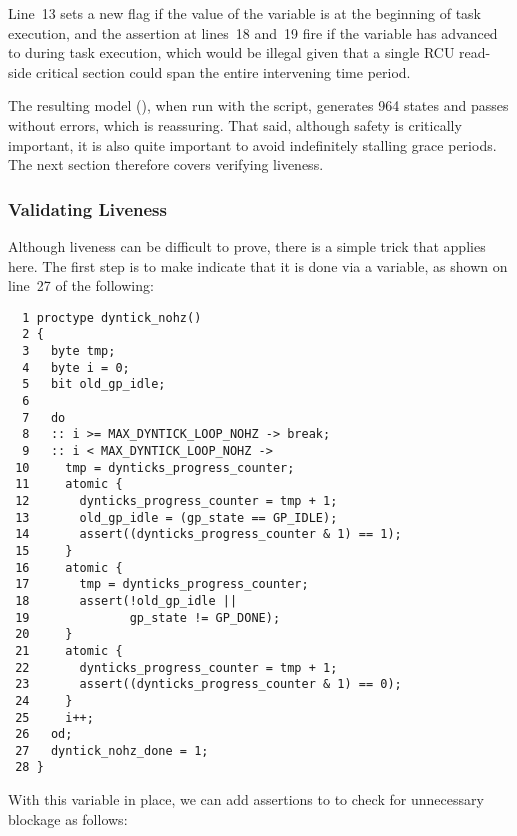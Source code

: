 Line~13 sets a new  flag if the
value of the  variable is
 at the beginning of task execution,
and the assertion at lines~18 and~19 fire if the 
variable has advanced to  during task execution,
which would be illegal given that a single RCU read-side critical
section could span the entire intervening time period.

The resulting
model (),
when run with the  script,
generates 964 states and passes without errors, which is reassuring.
That said, although safety is critically important, it is also quite
important to avoid indefinitely stalling grace periods.
The next section therefore covers verifying liveness.

\subsubsection{Validating Liveness}
\label{sec:formal:Validating Liveness}

Although liveness can be difficult to prove, there is a simple
trick that applies here.
The first step is to make  indicate that
it is done via a  variable, as shown on
line~27 of the following:

{ \scriptsize
\begin{verbatim}
  1 proctype dyntick_nohz()
  2 {
  3   byte tmp;
  4   byte i = 0;
  5   bit old_gp_idle;
  6
  7   do
  8   :: i >= MAX_DYNTICK_LOOP_NOHZ -> break;
  9   :: i < MAX_DYNTICK_LOOP_NOHZ ->
 10     tmp = dynticks_progress_counter;
 11     atomic {
 12       dynticks_progress_counter = tmp + 1;
 13       old_gp_idle = (gp_state == GP_IDLE);
 14       assert((dynticks_progress_counter & 1) == 1);
 15     }
 16     atomic {
 17       tmp = dynticks_progress_counter;
 18       assert(!old_gp_idle ||
 19              gp_state != GP_DONE);
 20     }
 21     atomic {
 22       dynticks_progress_counter = tmp + 1;
 23       assert((dynticks_progress_counter & 1) == 0);
 24     }
 25     i++;
 26   od;
 27   dyntick_nohz_done = 1;
 28 }
\end{verbatim}
}

With this variable in place, we can add assertions to
 to check for unnecessary blockage
as follows:

